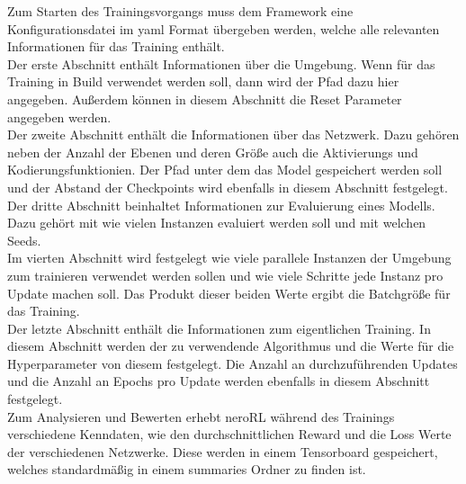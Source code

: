 \noindent Zum Starten des Trainingsvorgangs muss dem Framework eine Konfigurationsdatei im yaml Format übergeben werden, welche alle relevanten Informationen für das Training enthält.\\
Der erste Abschnitt enthält Informationen über die Umgebung. Wenn für das Training in Build verwendet werden soll, dann wird der Pfad dazu hier angegeben. Außerdem können in diesem Abschnitt die Reset Parameter angegeben werden.\\
Der zweite Abschnitt enthält die Informationen über das Netzwerk. Dazu gehören neben der Anzahl der Ebenen und deren Größe
auch die Aktivierungs und Kodierungsfunktionien. Der Pfad unter dem das Model gespeichert werden soll und der Abstand der Checkpoints wird ebenfalls in diesem Abschnitt festgelegt.\\
Der dritte Abschnitt beinhaltet Informationen zur Evaluierung eines Modells. Dazu gehört mit wie vielen Instanzen evaluiert werden soll und mit welchen Seeds.\\
Im vierten Abschnitt wird festgelegt wie viele parallele Instanzen der Umgebung zum trainieren verwendet werden sollen und wie viele Schritte jede Instanz pro Update machen soll. Das Produkt dieser beiden Werte ergibt die Batchgröße für das Training.\\
Der letzte Abschnitt enthält die Informationen zum eigentlichen Training. In diesem Abschnitt werden der zu verwendende Algorithmus und die Werte für die Hyperparameter von diesem festgelegt. Die Anzahl an durchzuführenden Updates und die Anzahl an Epochs pro Update werden ebenfalls in diesem Abschnitt festgelegt.\\

\noindent Zum Analysieren und Bewerten erhebt neroRL während des Trainings verschiedene Kenndaten, wie den durchschnittlichen Reward und die Loss Werte der verschiedenen Netzwerke. Diese werden in einem Tensorboard gespeichert, welches standardmäßig in einem summaries Ordner zu finden ist.
